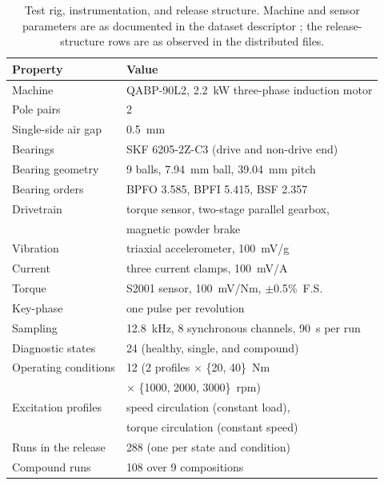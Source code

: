 \documentclass[journal]{IEEEtran}
\begin{document}
\begin{table}[!t]
\caption{Test rig, instrumentation, and release structure. Machine and sensor
parameters are as documented in the dataset descriptor \cite{chen2026}; the
release-structure rows are as observed in the distributed files.}
\label{tab:rig}
\centering
\footnotesize
\setlength{\tabcolsep}{4pt}
\begin{tabular}{l l}
\toprule
Property & Value \\
\midrule
Machine & QABP-90L2, 2.2~kW three-phase induction motor \\
Pole pairs & 2 \\
Single-side air gap & 0.5~mm \\
Bearings & SKF 6205-2Z-C3 (drive and non-drive end) \\
Bearing geometry & 9 balls, 7.94~mm ball, 39.04~mm pitch \\
Bearing orders & BPFO 3.585, BPFI 5.415, BSF 2.357 \\
Drivetrain & torque sensor, two-stage parallel gearbox, \\
           & magnetic powder brake \\
\midrule
Vibration & triaxial accelerometer, 100~mV/g \\
Current & three current clamps, 100~mV/A \\
Torque & S2001 sensor, 100~mV/Nm, $\pm$0.5\%~F.S. \\
Key-phase & one pulse per revolution \\
Sampling & 12.8~kHz, 8 synchronous channels, 90~s per run \\
\midrule
Diagnostic states & 24 (healthy, single, and compound) \\
Operating conditions & 12 (2 profiles $\times$ \{20, 40\}~Nm \\
                     & $\times$ \{1000, 2000, 3000\}~rpm) \\
Excitation profiles & speed circulation (constant load), \\
                    & torque circulation (constant speed) \\
Runs in the release & 288 (one per state and condition) \\
Compound runs & 108 over 9 compositions \\
\bottomrule
\end{tabular}
\end{table}
\end{document}
